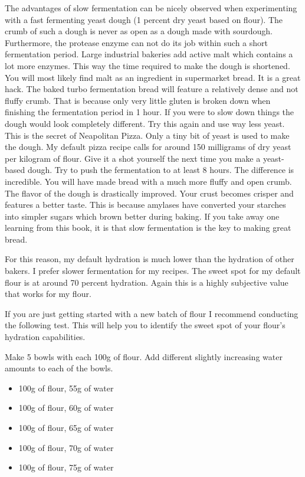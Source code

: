 The advantages of slow fermentation can be nicely observed when experimenting
with a fast fermenting yeast dough (1 percent dry yeast based on flour). The
crumb of such a dough is never as
open as a dough made with sourdough. Furthermore, the protease enzyme
can not do its job within such a short fermentation period.
Large industrial bakeries add active malt which contains a
lot more enzymes. This way the time required to make the dough is shortened. You
will most likely find malt as an ingredient in supermarket bread. It is a
great hack. The baked turbo fermentation bread will feature a relatively dense
and not fluffy crumb. That is because only very little gluten is broken down when
finishing the fermentation period in 1 hour. If you were to slow down things
the dough would look completely different.
Try this again and use way less yeast. This is the
secret of Neapolitan Pizza. Only a tiny bit of yeast is used to make the
dough. My default pizza recipe calls for around 150 milligrams of dry
yeast per kilogram of flour. Give it a shot yourself the next time you
make a yeast-based dough. Try to push the fermentation to at least 8 hours.
The difference is incredible. You will have made bread with a much more
fluffy and open crumb. The flavor of the dough is drastically improved. Your
crust becomes crisper and features a better taste. This is because amylases have
converted your starches into simpler sugars which brown better during baking.
If you take away one learning from this book, it is that slow fermentation is
the key to making great bread.

For this reason, my default hydration is much lower than the hydration of other
bakers. I prefer slower fermentation for my recipes.
The sweet spot for my default flour is at around 70 percent hydration.
Again this is a highly subjective value that works for my flour.

If you are just getting started with a new batch of flour
I recommend conducting the following test. This will help you to
identify the sweet spot of your flour's hydration capabilities.

Make 5 bowls with each 100g of flour. Add different slightly increasing
water amounts to each of the bowls.

\begin{itemize}
  \item 100g of flour, 55g of water
  \item 100g of flour, 60g of water
  \item 100g of flour, 65g of water
  \item 100g of flour, 70g of water
  \item 100g of flour, 75g of water
\end{itemize}

